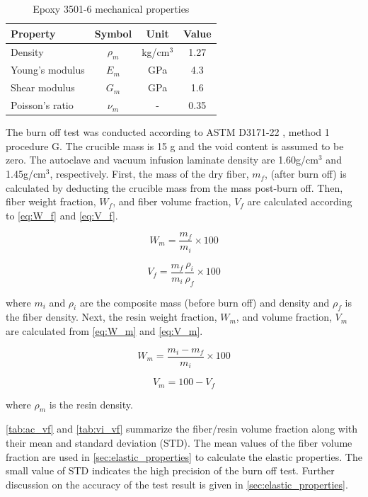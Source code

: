 \documentclass{article}
\begin{document}
\begin{table}[H]
    \centering
    \begin{tabular}{lccc} \hline
        Property & Symbol & Unit & Value \\ \hline
        Density & $\rho_m$ & kg/cm$^3$ & 1.27 \\
        Young's modulus & $E_m$ & GPa & 4.3 \\
        Shear modulus & $G_m$ & GPa & 1.6 \\
        Poisson's ratio & $\nu_{m}$ & - & 0.35 \\ \hline
    \end{tabular}
    \caption{Epoxy 3501-6 mechanical properties}
    \label{tab:resin_prop}
\end{table}

The burn off test was conducted according to ASTM D3171-22 \cite{ASTMD3171}, method 1 procedure G. The crucible mass is 15 g and the void content is assumed to be zero. The autoclave and vacuum infusion laminate density are 1.60g/cm$^3$ and 1.45g/cm$^3$, respectively. First, the mass of the dry fiber, $m_f$, (after burn off) is calculated by deducting the crucible mass from the mass post-burn off. Then, fiber weight fraction, $W_f$, and fiber volume fraction, $V_f$ are calculated according to \cref{eq:W_f} and \cref{eq:V_f}.

\begin{equation}
    W_m = \dfrac{m_f}{m_i} \times 100
    \label{eq:W_f}
\end{equation}

\begin{equation}
    V_f = \dfrac{m_f}{m_i} \dfrac{\rho_i}{\rho_f} \times 100
    \label{eq:V_f}
\end{equation}

where $m_i$ and $\rho_i$ are the composite mass (before burn off) and density and $\rho_f$ is the fiber density. Next, the resin weight fraction, $W_m$, and volume fraction, $V_m$ are calculated from \cref{eq:W_m} and \cref{eq:V_m}.

\begin{equation}
    W_m = \dfrac{m_i - m_f}{m_i} \times 100
    \label{eq:W_m}
\end{equation}

\begin{equation}
    V_m = 100 - V_f
    \label{eq:V_m}
\end{equation}

where $\rho_m$ is the resin density.

\cref{tab:ac_vf} and \cref{tab:vi_vf} summarize the fiber/resin volume fraction along with their mean and standard deviation (STD). The mean values of the fiber volume fraction are used in \cref{sec:elastic_properties} to calculate the elastic properties. The small value of STD indicates the high precision of the burn off test. Further discussion on the accuracy of the test result is given in \cref{sec:elastic_properties}.
\end{document}
